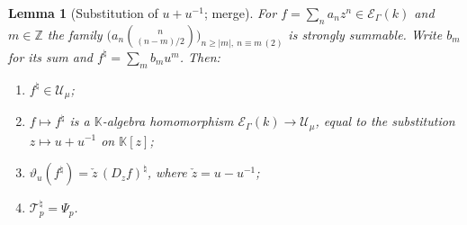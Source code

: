 \documentclass[11pt]{article}
\numberwithin{equation}{section}
\newtheorem{lemma}[theorem]{Lemma}
\theoremstyle{definition}
\theoremstyle{remark}
\newcommand{\Z}{\mathbb Z}
\newcommand{\abs}[1]{\lvert#1\rvert}
\newcommand{\KK}{\mathbb K}
\newcommand{\EK}{\mathcal E_\Gamma(k)}
\begin{document}
\begin{lemma}[Substitution of $u+u^{-1}$; merge]\label{hol:td:lem:substitution}
For $f=\sum_na_nz^n\in\EK$ and $m\in\Z$ the family
$\bigl(a_n\binom n{(n-m)/2}\bigr)_{n\ge\abs m,\ n\equiv m\,(2)}$ is strongly
summable. Write $b_m$ for its sum and $f^\natural=\sum_mb_mu^m$. Then:
\begin{enumerate}[label=\textup{(\alph*)}]
\item $f^\natural\in\mathcal U_\mu$;
\item $f\mapsto f^\natural$ is a $\KK$-algebra homomorphism
$\EK\to\mathcal U_\mu$, equal to the substitution $z\mapsto u+u^{-1}$ on
$\KK[z]$;
\item $\vartheta_u(f^\natural)=\check z\,(D_zf)^\natural$, where $\check
z=u-u^{-1}$;
\item $\mathcal T_p^\natural=\Psi_p$.
\end{enumerate}
\end{lemma}
\end{document}
